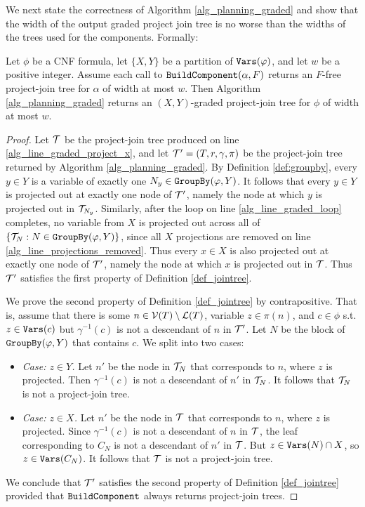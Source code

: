 We next state the correctness of Algorithm \ref{alg_planning_graded} and show that the width of the output graded project join tree is no worse than the widths of the trees used for the components. Formally:
\begin{theorem}
\label{thm:planning_graded_correctness}
Let $\phi$ be a CNF formula, let $\{X, Y\}$ be a partition of $\texttt{\upshape Vars}(\varphi)$, and let $w$ be a positive integer. 
Assume each call to $\texttt{\upshape BuildComponent}(\alpha, F)$ returns an $F$-free project-join tree for $\alpha$ of width at most $w$. 
Then Algorithm \ref{alg_planning_graded} returns an $(X,Y)$-graded project-join tree for $\phi$ of width at most $w$.
\end{theorem}
\begin{proof}
Let $\mathcal{T}$ be the project-join tree produced on line \ref{alg_line_graded_project_x}, and let $\mathcal{T}' = (T, r, \gamma, \pi)$ be the project-join tree returned by Algorithm \ref{alg_planning_graded}. 
By Definition \ref{def:groupby}, every $y \in Y$ is a variable of exactly one $N_y \in \texttt{\upshape GroupBy}(\varphi, Y)$. It follows that every $y \in Y$ is projected out at exactly one node of $\mathcal{T}'$, namely the node at which $y$ is projected out in $\mathcal{T}_{N_y}$. Similarly, after the loop on line \ref{alg_line_graded_loop} completes, no variable from $X$ is projected out across all of $\{\mathcal{T}_N : N \in \texttt{\upshape GroupBy}(\varphi, Y)\}$, since all $X$ projections are removed on line \ref{alg_line_projections_removed}. Thus every $x \in X$ is also projected out at exactly one node of $\mathcal{T}'$, namely the node at which $x$ is projected out in $\mathcal{T}$. Thus $\mathcal{T}'$ satisfies the first property of Definition \ref{def_jointree}.

We prove the second property of Definition \ref{def_jointree} by contrapositive. That is, assume that there is some $n \in \mathcal{V}(T) \setminus \mathcal{L}(T)$, variable $z \in \pi(n)$, and $c \in \phi$ s.t. $z \in \texttt{\upshape Vars}(c)$ but $\gamma^{-1}(c)$ is not a descendant of $n$ in $\mathcal{T}'$. Let $N$ be the block of $\texttt{\upshape GroupBy}(\varphi, Y)$ that contains $c$. We split into two cases:
\begin{itemize}
    \item \textit{Case: $z \in Y$.} Let $n'$ be the node in $\mathcal{T}_N$ that corresponds to $n$, where $z$ is projected. Then $\gamma^{-1}(c)$ is not a descendant of $n'$ in $\mathcal{T}_N$. It follows that $\mathcal{T}_N$ is not a project-join tree.
    \item \textit{Case: $z \in X$.} Let $n'$ be the node in $\mathcal{T}$ that corresponds to $n$, where $z$ is projected. Since  $\gamma^{-1}(c)$ is not a descendant of $n$ in $\mathcal{T}$, the leaf corresponding to $C_N$ is not a descendant of $n'$ in $\mathcal{T}$. But $z \in \texttt{\upshape Vars}(N) \cap X$, so $z \in \texttt{\upshape Vars}(C_N)$. It follows that $\mathcal{T}$ is not a project-join tree. 
\end{itemize} 
We conclude that $\mathcal{T}'$ satisfies the second property of Definition \ref{def_jointree} provided that $\texttt{\upshape BuildComponent}$ always returns project-join trees.


\end{proof}
